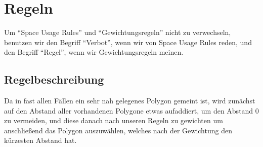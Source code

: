 \section{Regeln}
\label{sec:Regeln}
Um ``Space Usage Rules'' und ``Gewichtungsregeln'' nicht zu verwechseln, benutzen wir den Begriff ``Verbot'', wenn wir von 
Space Usage Rules reden, und den Begriff ``Regel'', wenn wir Gewichtungsregeln meinen.
\subsection{Regelbeschreibung}
Da in fast allen Fällen ein sehr nah gelegenes Polygon gemeint ist, wird zunächst auf den Abstand aller vorhandenen Polygone etwas aufaddiert,
um den Abstand 0 zu vermeiden, und diese danach nach unseren Regeln zu gewichten um anschließend das Polygon auszuwählen,
welches nach der Gewichtung den kürzesten Abstand hat.



